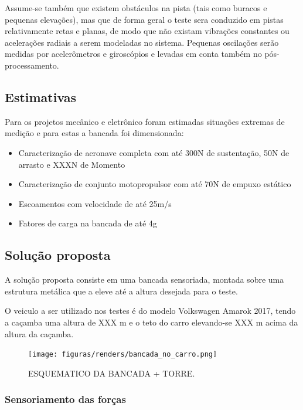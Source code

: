 Assume-se também que existem obstáculos na pista (tais como buracos e pequenas elevações), mas que de forma geral o teste sera conduzido em pistas relativamente retas e planas, de modo que não existam vibrações constantes ou acelerações radiais a serem modeladas no sistema. Pequenas oscilações serão medidas por acelerômetros e giroscópios e levadas em conta também no pós-processamento.

\subsection{Estimativas}

Para os projetos mecânico e eletrônico foram estimadas situações extremas de medição e para estas a bancada foi dimensionada:

\begin{itemize}
    \item Caracterização de aeronave completa com até 300N de sustentação, 50N de arrasto e XXXN de Momento
    \item Caracterização de conjunto motopropulsor com até 70N de empuxo estático
    \item Escoamentos com velocidade de até 25m/s
    \item Fatores de carga na bancada de até 4g
\end{itemize}

\subsection{Solução proposta}

A solução proposta consiste em uma bancada sensoriada, montada sobre uma estrutura metálica que a eleve até a altura desejada para o teste.

O veiculo a ser utilizado nos testes é do modelo Volkswagen Amarok 2017, tendo a caçamba uma altura de XXX m e o teto do carro elevando-se XXX m acima da altura da caçamba.

\begin{figure}[!ht]
    \centering
    \texttt{[image: figuras/renders/bancada\_no\_carro.png]}
    \caption{ESQUEMATICO DA BANCADA + TORRE\cite{autor}.}
    \label{fig:placeholder}
\end{figure}

\subsubsection{Sensoriamento das forças}

